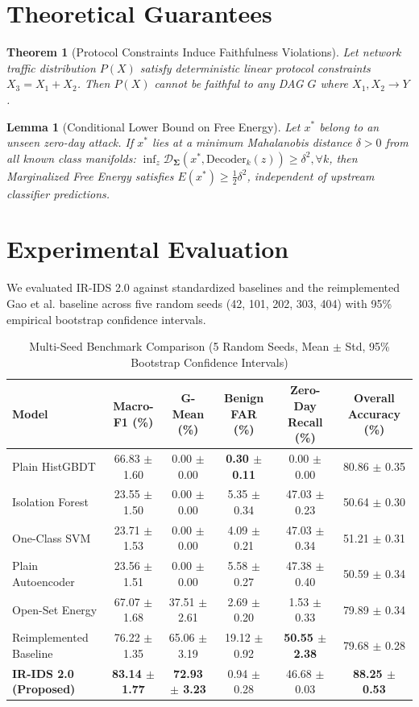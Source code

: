 \documentclass[5p,times,twocolumn]{elsarticle}
\newtheorem{theorem}{Theorem}
\newtheorem{lemma}{Lemma}
\begin{document}
\section{Theoretical Guarantees}
\begin{theorem}[Protocol Constraints Induce Faithfulness Violations]
Let network traffic distribution $P(X)$ satisfy deterministic linear protocol constraints $X_3 = X_1 + X_2$. Then $P(X)$ cannot be faithful to any DAG $G$ where $X_1, X_2 \to Y$.
\end{theorem}

\begin{lemma}[Conditional Lower Bound on Free Energy]
Let $x^*$ belong to an unseen zero-day attack. If $x^*$ lies at a minimum Mahalanobis distance $\delta > 0$ from all known class manifolds: $\inf_{z} \mathcal{D}_{\mathbf{\Sigma}}(x^*, \text{Decoder}_k(z)) \ge \delta^2, \forall k$, then Marginalized Free Energy satisfies $E(x^*) \ge \frac{1}{2} \delta^2$, independent of upstream classifier predictions.
\end{lemma}

\section{Experimental Evaluation}
We evaluated IR-IDS 2.0 against standardized baselines and the reimplemented Gao et al. baseline across five random seeds (42, 101, 202, 303, 404) with 95\% empirical bootstrap confidence intervals.

\begin{table}[htbp]
\caption{Multi-Seed Benchmark Comparison (5 Random Seeds, Mean $\pm$ Std, 95\% Bootstrap Confidence Intervals)}
\label{tab:macro_results}
\centering
\begin{tabular}{lccccc}
\toprule
\textbf{Model} & \textbf{Macro-F1 (\%)} & \textbf{G-Mean (\%)} & \textbf{Benign FAR (\%)} & \textbf{Zero-Day Recall (\%)} & \textbf{Overall Accuracy (\%)} \\
\midrule
Plain HistGBDT & 66.83 $\pm$ 1.60 & 0.00 $\pm$ 0.00 & \textbf{0.30 $\pm$ 0.11} & 0.00 $\pm$ 0.00 & 80.86 $\pm$ 0.35 \\
Isolation Forest & 23.55 $\pm$ 1.50 & 0.00 $\pm$ 0.00 & 5.35 $\pm$ 0.34 & 47.03 $\pm$ 0.23 & 50.64 $\pm$ 0.30 \\
One-Class SVM & 23.71 $\pm$ 1.53 & 0.00 $\pm$ 0.00 & 4.09 $\pm$ 0.21 & 47.03 $\pm$ 0.34 & 51.21 $\pm$ 0.31 \\
Plain Autoencoder & 23.56 $\pm$ 1.51 & 0.00 $\pm$ 0.00 & 5.58 $\pm$ 0.27 & 47.38 $\pm$ 0.40 & 50.59 $\pm$ 0.34 \\
Open-Set Energy & 67.07 $\pm$ 1.68 & 37.51 $\pm$ 2.61 & 2.69 $\pm$ 0.20 & 1.53 $\pm$ 0.33 & 79.89 $\pm$ 0.34 \\
Reimplemented Baseline & 76.22 $\pm$ 1.35 & 65.06 $\pm$ 3.19 & 19.12 $\pm$ 0.92 & \textbf{50.55 $\pm$ 2.38} & 79.68 $\pm$ 0.28 \\
\textbf{IR-IDS 2.0 (Proposed)} & \textbf{83.14 $\pm$ 1.77} & \textbf{72.93 $\pm$ 3.23} & 0.94 $\pm$ 0.28 & 46.68 $\pm$ 0.03 & \textbf{88.25 $\pm$ 0.53} \\
\bottomrule
\end{tabular}
\end{table}
\end{document}
